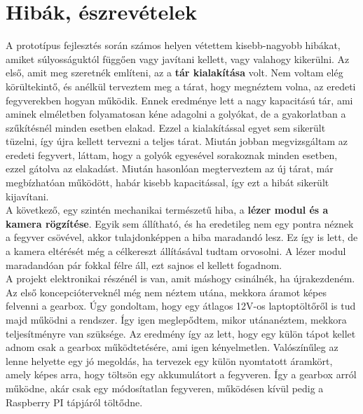 \chapter{Hibák, észrevételek}

A prototípus fejlesztés során számos helyen vétettem kisebb-nagyobb hibákat, amiket súlyosságuktól függően vagy javítani kellett, vagy valahogy kikerülni. Az első, amit meg szeretnék említeni, az a \textbf{tár kialakítása} volt. Nem voltam elég körültekintő, és anélkül terveztem meg a tárat, hogy megnéztem volna, az eredeti fegyverekben hogyan működik. Ennek eredménye lett a nagy kapacitású tár, ami aminek elméletben folyamatosan kéne adagolni a golyókat, de a gyakorlatban a szűkítésnél minden esetben elakad. Ezzel a kialakítással egyet sem sikerült tüzelni, így újra kellett tervezni a teljes tárat. Miután jobban megvizsgáltam az eredeti fegyvert, láttam, hogy a golyók egyesével sorakoznak minden esetben, ezzel gátolva az elakadást. Miután hasonlóan megterveztem az új tárat, már megbízhatóan működött, habár kisebb kapacitással, így ezt a hibát sikerült kijavítani.\\

A következő, egy szintén mechanikai természetű hiba, a \textbf{lézer modul és a kamera rögzítése}. Egyik sem állítható, és ha eredetileg nem egy pontra néznek a fegyver csövével, akkor tulajdonképpen a hiba maradandó lesz. Ez így is lett, de a kamera eltérését még a célkereszt állításával tudtam orvosolni. A lézer modul maradandóan pár fokkal félre áll, ezt sajnos el kellett fogadnom.\\

A projekt elektronikai részénél is van, amit máshogy csinálnék, ha újrakezdeném. Az első koncepcióterveknél még nem néztem utána, mekkora áramot képes felvenni a gearbox. Úgy gondoltam, hogy egy átlagos 12V-os laptoptöltőről is tud majd működni a rendszer. Így igen meglepődtem, mikor utánanéztem, mekkora teljesítményre van szüksége. Az eredmény így az lett, hogy egy külön tápot kellet adnom csak a gearbox működtetésére, ami igen kényelmetlen. Valószínűleg az lenne helyette egy jó megoldás, ha tervezek egy külön nyomtatott áramkört, amely képes arra, hogy töltsön egy akkumulátort a fegyveren. Így a gearbox arról működne, akár csak egy módosítatlan fegyveren, működésen kívül pedig a Raspberry PI tápjáról töltődne. 